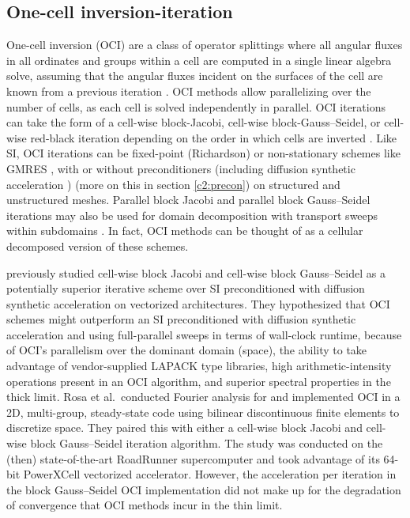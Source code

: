 \subsection{One-cell inversion-iteration}
\label{c2:oci}

One-cell inversion (OCI) are a class of operator splittings where all angular fluxes in all ordinates and groups within a cell are computed in a single linear algebra solve, assuming that the angular fluxes incident on the surfaces of the cell are known from a previous iteration \cite{kang2000oci}.
OCI methods allow parallelizing over the number of cells, as each cell is solved independently in parallel.
OCI iterations can take the form of a cell-wise block-Jacobi, cell-wise block-Gauss--Seidel, or cell-wise red-black iteration depending on the order in which cells are inverted \cite{man1994parallel}.
Like SI, OCI iterations can be fixed-point (Richardson) or non-stationary schemes like GMRES \cite{kylov2004warsa}, with or without preconditioners (including diffusion synthetic acceleration \cite{kang2000oci}) (more on this in section \ref{c2:precon}) on structured and unstructured meshes.
Parallel block Jacobi and parallel block Gauss--Seidel iterations may also be used for domain decomposition with transport sweeps within subdomains \cite{qiao_improved_2021}.
In fact, OCI methods can be thought of as a cellular decomposed version of these schemes.

\cite{rosa_cellwise_2013} previously studied cell-wise block Jacobi and cell-wise block Gauss--Seidel as a potentially superior iterative scheme over SI preconditioned with diffusion synthetic acceleration on vectorized architectures.
They hypothesized that OCI schemes might outperform an SI preconditioned with diffusion synthetic acceleration and using full-parallel sweeps in terms of wall-clock runtime, because of OCI's parallelism over the dominant domain (space), the ability to take advantage of vendor-supplied LAPACK type libraries, high arithmetic-intensity operations present in an OCI algorithm, and superior spectral properties in the thick limit.
Rosa et al.\ conducted Fourier analysis for and implemented OCI in a 2D, multi-group, steady-state code using bilinear discontinuous finite elements to discretize space.
They paired this with either a cell-wise block Jacobi and cell-wise block Gauss--Seidel iteration algorithm.
The study was conducted on the (then) state-of-the-art RoadRunner supercomputer and took advantage of its 64-bit PowerXCell vectorized accelerator.
However, the acceleration per iteration in the block Gauss--Seidel OCI implementation did not make up for the degradation of convergence that OCI methods incur in the thin limit.


